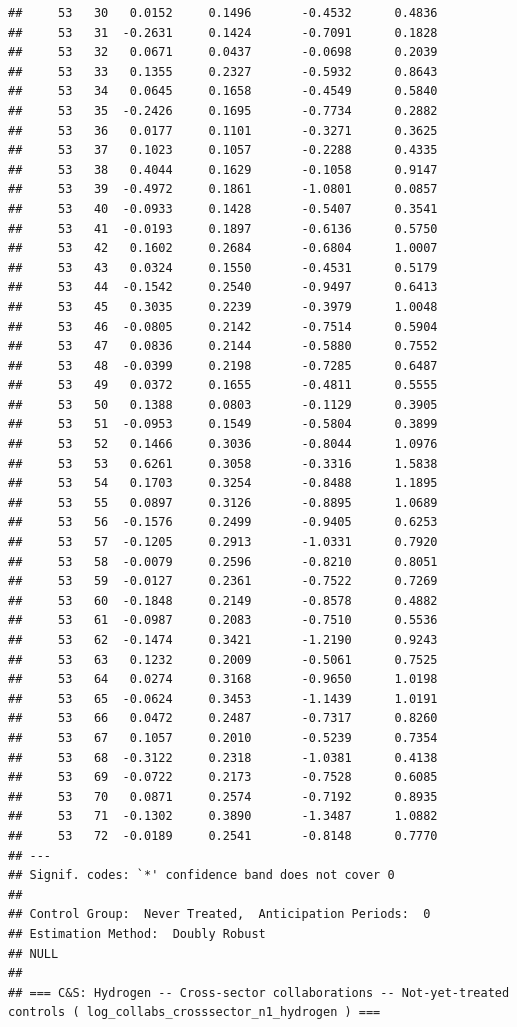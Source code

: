 \documentclass[
]{article}
\begin{document}
\begin{verbatim}
##     53   30   0.0152     0.1496       -0.4532      0.4836  
##     53   31  -0.2631     0.1424       -0.7091      0.1828  
##     53   32   0.0671     0.0437       -0.0698      0.2039  
##     53   33   0.1355     0.2327       -0.5932      0.8643  
##     53   34   0.0645     0.1658       -0.4549      0.5840  
##     53   35  -0.2426     0.1695       -0.7734      0.2882  
##     53   36   0.0177     0.1101       -0.3271      0.3625  
##     53   37   0.1023     0.1057       -0.2288      0.4335  
##     53   38   0.4044     0.1629       -0.1058      0.9147  
##     53   39  -0.4972     0.1861       -1.0801      0.0857  
##     53   40  -0.0933     0.1428       -0.5407      0.3541  
##     53   41  -0.0193     0.1897       -0.6136      0.5750  
##     53   42   0.1602     0.2684       -0.6804      1.0007  
##     53   43   0.0324     0.1550       -0.4531      0.5179  
##     53   44  -0.1542     0.2540       -0.9497      0.6413  
##     53   45   0.3035     0.2239       -0.3979      1.0048  
##     53   46  -0.0805     0.2142       -0.7514      0.5904  
##     53   47   0.0836     0.2144       -0.5880      0.7552  
##     53   48  -0.0399     0.2198       -0.7285      0.6487  
##     53   49   0.0372     0.1655       -0.4811      0.5555  
##     53   50   0.1388     0.0803       -0.1129      0.3905  
##     53   51  -0.0953     0.1549       -0.5804      0.3899  
##     53   52   0.1466     0.3036       -0.8044      1.0976  
##     53   53   0.6261     0.3058       -0.3316      1.5838  
##     53   54   0.1703     0.3254       -0.8488      1.1895  
##     53   55   0.0897     0.3126       -0.8895      1.0689  
##     53   56  -0.1576     0.2499       -0.9405      0.6253  
##     53   57  -0.1205     0.2913       -1.0331      0.7920  
##     53   58  -0.0079     0.2596       -0.8210      0.8051  
##     53   59  -0.0127     0.2361       -0.7522      0.7269  
##     53   60  -0.1848     0.2149       -0.8578      0.4882  
##     53   61  -0.0987     0.2083       -0.7510      0.5536  
##     53   62  -0.1474     0.3421       -1.2190      0.9243  
##     53   63   0.1232     0.2009       -0.5061      0.7525  
##     53   64   0.0274     0.3168       -0.9650      1.0198  
##     53   65  -0.0624     0.3453       -1.1439      1.0191  
##     53   66   0.0472     0.2487       -0.7317      0.8260  
##     53   67   0.1057     0.2010       -0.5239      0.7354  
##     53   68  -0.3122     0.2318       -1.0381      0.4138  
##     53   69  -0.0722     0.2173       -0.7528      0.6085  
##     53   70   0.0871     0.2574       -0.7192      0.8935  
##     53   71  -0.1302     0.3890       -1.3487      1.0882  
##     53   72  -0.0189     0.2541       -0.8148      0.7770  
## ---
## Signif. codes: `*' confidence band does not cover 0
## 
## Control Group:  Never Treated,  Anticipation Periods:  0
## Estimation Method:  Doubly Robust
## NULL
## 
## === C&S: Hydrogen -- Cross-sector collaborations -- Not-yet-treated controls ( log_collabs_crosssector_n1_hydrogen ) ===
\end{verbatim}
\end{document}
